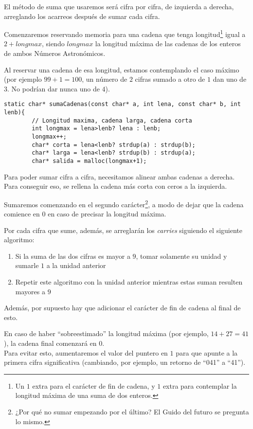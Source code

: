 \documentclass[a4paper, 12pt]{article}
\begin{document}
El método de suma que usaremos será cifra por cifra, de izquierda a derecha, arreglando los acarreos después de sumar cada cifra.

Comenzaremos reservando memoria para una cadena que tenga longitud\footnote{Un $1$ extra para el carácter de fin de cadena, y $1$ extra para contemplar la longitud máxima de una suma de dos enteros.} igual a $2+longmax$, siendo $longmax$ la longitud máxima de las cadenas de los enteros de ambos Números Astronómicos.

Al reservar una cadena de esa longitud, estamos contemplando el caso máximo (por ejemplo $99+1=100$, un número de $2$ cifras sumado a otro de $1$ dan uno de $3$. No podrían dar nunca uno de $4$).

\begin{lstlisting}[style=C]
    static char* sumaCadenas(const char* a, int lena, const char* b, int lenb){
        // Longitud maxima, cadena larga, cadena corta
        int longmax = lena>lenb? lena : lenb;
        longmax++;
        char* corta = lena<lenb? strdup(a) : strdup(b);
        char* larga = lena<lenb? strdup(b) : strdup(a);
        char* salida = malloc(longmax+1);
\end{lstlisting}

Para poder sumar cifra a cifra, necesitamos alinear ambas cadenas a derecha. Para conseguir eso, se rellena la cadena más corta con ceros a la izquierda.

Sumaremos comenzando en el segundo carácter\footnote{¿Por qué no sumar empezando por el último? El Guido del futuro se pregunta lo mismo.}, a modo de dejar que la cadena comience en $0$ en caso de precisar la longitud máxima.

Por cada cifra que sume, además, se arreglarán los \emph{carries} siguiendo el siguiente algoritmo:

\begin{enumerate}
    \item Si la suma de las dos cifras es mayor a $9$, tomar solamente su unidad y sumarle $1$ a la unidad anterior
    \item Repetir este algoritmo con la unidad anterior mientras estas suman resulten mayores a $9$
\end{enumerate}

Además, por supuesto hay que adicionar el carácter de fin de cadena al final de esto.

En caso de haber ``sobreestimado'' la longitud máxima (por ejemplo, $14+27=41$), la cadena final comenzará en $0$. \\
Para evitar esto, aumentaremos el valor del puntero en $1$ para que apunte a la primera cifra significativa (cambiando, por ejemplo, un retorno de ``041'' a ``41'').
\end{document}
